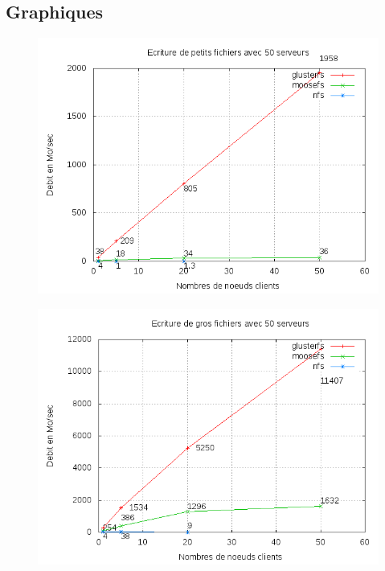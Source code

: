 \documentclass[blue]{beamer}
\begin{document}
	\subsection{Graphiques}
		\begin{frame}
			\begin{figure}
				\includegraphics[width=0.8\linewidth]{../images/srv50ws2.png}
			\end{figure}
		\end{frame}

		\begin{frame}
			\begin{figure}
				\includegraphics[width=0.8\linewidth]{../images/srv50wb2.png}
			\end{figure}
		\end{frame}
\end{document}
